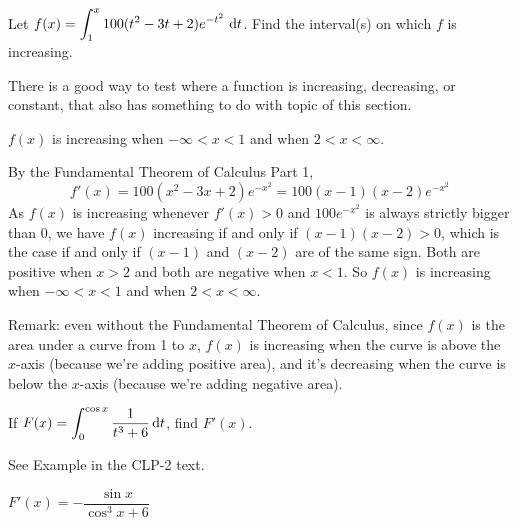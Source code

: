 \begin{Mquestion}[2014A]
Let $f(x)=\displaystyle\int_1^x 100(t^2-3t+2)e^{-t^2}\ \mathrm{d}t$.
Find the interval(s) on which $f$ is increasing.
\end{Mquestion}

\begin{hint}
There is a good way to test where a function is increasing,
decreasing, or constant, that also has something to do with topic
of this section.
\end{hint}

\begin{answer}
$f(x)$ is increasing when
$-\infty<x<1$ and when $2<x<\infty$.
\end{answer}

\begin{solution}
By the Fundamental Theorem of Calculus Part 1,
\begin{equation*}
f'(x) = 100(x^2-3x+2)e^{-x^2}
      = 100(x-1)(x-2)e^{-x^2}
\end{equation*}
As $f(x)$ is increasing whenever $f'(x)>0$ and $100 e^{-x^2}$
is always strictly bigger than $0$,
we have $f(x)$ increasing if and only if $(x-1)(x-2)>0$, which
is the case if and only if $(x-1)$ and $(x-2)$ are of the same
sign. Both are positive when $x>2$ and both are negative when
$x<1$. So $f(x)$ is increasing when
$-\infty<x<1$ and when $2<x<\infty$.

Remark: even without the Fundamental Theorem of Calculus, since $f(x)$ is the area under a curve from 1 to $x$, $f(x)$ is increasing when the curve is above the $x$-axis (because we're adding positive area), and it's decreasing when the curve is below the $x$-axis (because we're adding negative area).
\end{solution}

\begin{Mquestion}[M105 2013A]
If $F(x)={\displaystyle\int_0^{\cos x} \frac{1}{t^3+6}\,\mathrm{d}t}$,
find $F'(x)$.
\end{Mquestion}

\begin{hint}
See Example  in the
CLP-2 text.
\end{hint}

\begin{answer}
$F'(x)=-\dfrac{\sin x}{\cos^3x+6}$
\end{answer}

